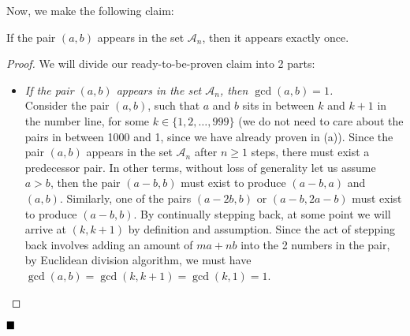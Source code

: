 \documentclass[11pt]{article}
\newenvironment{solution}[1][Solution]{%
  \proof[\normalfont \faPenNib \hspace{0.2cm} \ttfamily \scshape \large #1]%
}{\(\hfill \blacksquare\){\parfillskip0pt\par}}
\theoremstyle{definition}
\begin{document}
\begin{solution}
\begin{enumerate}
\begin{center}
                \end{center}

                Now, we make the following claim:

                \begin{claim}
                    If the pair \((a,b)\) appears in the set \(\mathcal{A}_n\), then it appears exactly once.
                \end{claim}

                \begin{proof}
                    We will divide our ready-to-be-proven claim into 2 parts:
                    
                    \begin{itemize}
                        \item \textit{If the pair \((a,b)\) appears in the set \(\mathcal{A}_n\), then \(\gcd(a,b) = 1\).}\\
                        Consider the pair \((a,b)\), such that \(a\) and \(b\) sits in between \(k\) and \(k + 1\) in the number line, for some \(k \in \{1,2,\dots,999\}\) (we do not need to care about the pairs in between 1000 and 1, since we have already proven in (a)). Since the pair \((a,b)\) appears in the set \(\mathcal{A}_n\) after \(n \geq 1\) steps, there must exist a predecessor pair. In other terms, without loss of generality let us assume \(a > b\), then the pair \((a - b,b)\) must exist to produce \((a - b,a)\) and \((a,b)\). Similarly, one of the pairs \((a - 2b,b)\) or \((a - b, 2a - b)\) must exist to produce \((a - b,b)\). By continually stepping back, at some point we will arrive at \((k,k + 1)\) by definition and assumption. Since the act of stepping back involves adding an amount of \(ma + nb\) into the 2 numbers in the pair, by Euclidean division algorithm, we must have \(\gcd(a,b) = \gcd(k,k+1) = \gcd(k,1) = 1\).
                        

\end{itemize}
\end{proof}
\end{enumerate}
\end{solution}
\end{document}
